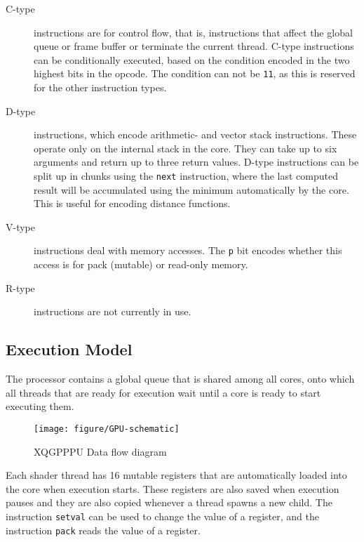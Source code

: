			\begin{description}
				\item[C-type] instructions are for control flow, that is, 
					instructions that affect the global queue or frame buffer or
					terminate the current thread. C-type instructions can be 
					conditionally executed, based on the condition encoded in
					the two highest bits in the opcode. The condition can not
					be \texttt{11}, as this is reserved for the other 
					instruction types.

				\item[D-type] instructions, which encode arithmetic- and vector  %
					stack instructions. These operate only on the internal stack
					in the core. They can take up to six arguments and return up
					to three return values. D-type instructions can be split up 
					in chunks using the \texttt{next} instruction, where the 
					last computed result will be accumulated using the minimum
					automatically by the core. This is useful for encoding 
					distance functions.

				\item[V-type] instructions deal with memory accesses. The
					\texttt{p} bit encodes whether this access is for pack
					(mutable) or read-only memory.

				\item[R-type] instructions are not currently in use.
			\end{description}

		\subsection{Execution Model}

			The processor contains a global queue that is shared among all
			cores, onto which all threads that are ready for execution wait
			until a core is ready to start executing them.

			\begin{figure}[H]
				\centering
				\caption{ XQGPPPU Data flow diagram }
					\texttt{[image: figure/GPU-schematic]} 
				\vspace{-4pt}
			\end{figure}
	
			Each shader thread has 16 mutable registers that are automatically
			loaded into the core when execution starts. These registers are
			also saved when execution pauses and they are also copied whenever
			a thread spawns a new child. The instruction \texttt{setval} can be
			used to change the value of a register, and the instruction
			\texttt{pack} reads the value of a register.

